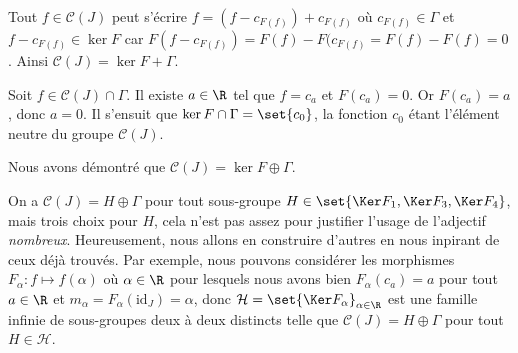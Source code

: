 \begin{enumerate}
    Tout $f\in\mathcal{C}(J)$ peut s'écrire $f = (f - c_{F(f)}) + c_{F(f)}$ où $c_{F(f)}\in\Gamma$ et $f - c_{F(f)}\in\ker F$ car $F(f - c_{F(f)}) = F(f) - F(c_{F(f)} = F(f) - F(f) = 0$.
    Ainsi $\mathcal{C}(J) = \ker F + \Gamma$.

    Soit $f\in\mathcal{C}(J)\cap\Gamma$.
    Il existe $a\in\R$ tel que $f = c_a$ et $F(c_a) = 0$.
    Or $F(c_a) = a$, donc $a = 0$.
    Il s'ensuit que $\ker F\cap\Gamma = \set{c_0}$, la fonction $c_0$ étant l'élément neutre du groupe $\mathcal{C}(J)$.

    Nous avons démontré que $\mathcal{C}(J) = \ker F\oplus\Gamma$.

    On a $\mathcal{C}(J) = H\oplus\Gamma$ pour tout sous-groupe $H\in\set{\Ker F_1, \Ker F_3, \Ker F_4}$, mais trois choix pour $H$, cela n'est pas assez pour justifier l'usage de l'adjectif \emph{nombreux}.
    Heureusement, nous allons en construire d'autres en nous inpirant de ceux déjà trouvés.
    Par exemple, nous pouvons considérer les morphismes $F_\alpha\colon f\mapsto f(\alpha)$ où $\alpha\in\R$ pour lesquels nous avons bien $F_\alpha(c_a) = a$ pour tout $a\in\R$ et $m_\alpha = F_\alpha(\mathrm{id}_J) = \alpha$, donc $\mathcal{H} = \set{\Ker F_\alpha}_{\alpha\in\R}$ est une famille infinie de sous-groupes deux à deux distincts telle que $\mathcal{C}(J) = H\oplus\Gamma$ pour tout $H\in\mathcal{H}$.
\end{enumerate}
